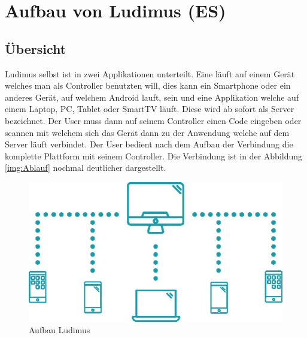 \section{Aufbau von Ludimus (ES)}
\subsection{Übersicht}

Ludimus selbst ist in zwei Applikationen unterteilt. Eine läuft auf einem Gerät welches man als Controller benutzten will,
dies kann ein Smartphone oder ein anderes Gerät, auf welchem Android lauft, sein und eine Applikation welche auf einem Laptop, PC, Tablet oder SmartTV läuft. Diese wird ab sofort als Server bezeichnet.
Der User muss dann auf seinem Controller einen Code eingeben oder scannen mit welchem sich das Gerät dann zu der Anwendung welche auf dem Server läuft verbindet. Der User bedient nach dem Aufbau der Verbindung die komplette Plattform mit seinem Controller. Die Verbindung ist in der Abbildung \ref{img:Ablauf} nochmal deutlicher dargestellt. 
\begin{figure}
    \includegraphics[scale=0.6]{images/ludi.jpg}
    \caption{Aufbau Ludimus}
    \label{img:Aufbau}
\end{figure}
\pagebreak

